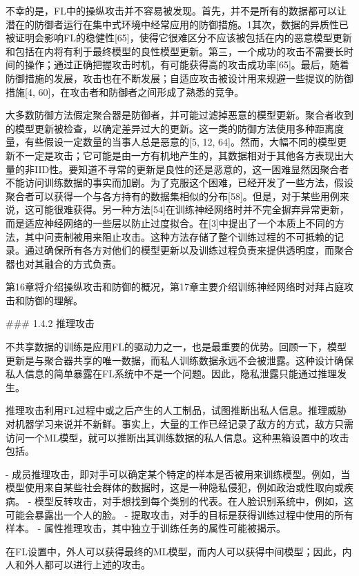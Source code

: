 不幸的是，FL中的操纵攻击并不容易被发现。首先，并不是所有的数据都可以让潜在的防御者运行在集中式环境中经常应用的防御措施。1其次，数据的异质性已被证明会影响FL的稳健性[65]，使得它很难区分不应该被包括在内的恶意模型更新和包括在内将有利于最终模型的良性模型更新。第三，一个成功的攻击不需要长时间的操作；通过正确把握攻击时机，有可能获得高的攻击成功率[65]。最后，随着防御措施的发展，攻击也在不断发展；自适应攻击被设计用来规避一些提议的防御措施[4, 60]，在攻击者和防御者之间形成了熟悉的竞争。

大多数防御方法假定聚合器是防御者，并可能过滤掉恶意的模型更新。聚合者收到的模型更新被检查，以确定差异过大的更新。这一类的防御方法使用多种距离度量，有些假设一定数量的当事人总是恶意的[5, 12, 64]。然而，大幅不同的模型更新不一定是攻击；它可能是由一方有机地产生的，其数据相对于其他各方表现出大量的非IID性。要知道不寻常的更新是良性的还是恶意的，这一困难显然因聚合者不能访问训练数据的事实而加剧。为了克服这个困难，已经开发了一些方法，假设聚合者可以获得一个与各方持有的数据集相似的分布[58]。但是，对于某些用例来说，这可能很难获得。另一种方法[54]在训练神经网络时并不完全摒弃异常更新，而是适应神经网络的一些层以防止过度拟合。在[3]中提出了一个本质上不同的方法，其中问责制被用来阻止攻击。这种方法存储了整个训练过程的不可抵赖的记录。通过确保所有各方对他们的模型更新以及训练过程负责来提供透明度，而聚合器也对其融合的方式负责。

第16章将介绍操纵攻击和防御的概况，第17章主要介绍训练神经网络时对拜占庭攻击和防御的理解。

### 1.4.2 推理攻击

不共享数据的训练是应用FL的驱动力之一，也是最重要的优势。回顾一下，模型更新是与聚合器共享的唯一数据，而私人训练数据永远不会被泄露。这种设计确保私人信息的简单暴露在FL系统中不是一个问题。因此，隐私泄露只能通过推理发生。

推理攻击利用FL过程中或之后产生的人工制品，试图推断出私人信息。推理威胁对机器学习来说并不新鲜。事实上，大量的工作已经记录了敌方的方式，敌方只需访问一个ML模型，就可以推断出其训练数据的私人信息。这种黑箱设置中的攻击包括。

- 成员推理攻击，即对手可以确定某个特定的样本是否被用来训练模型。例如，当模型使用来自某些社会群体的数据时，这是一种隐私侵犯，例如政治或性取向或疾病。
- 模型反转攻击，对手想找到每个类别的代表。在人脸识别系统中，例如，这可能会暴露出一个人的脸。
- 提取攻击，对手的目标是获得训练过程中使用的所有样本。
- 属性推理攻击，其中独立于训练任务的属性可能被揭示。

在FL设置中，外人可以获得最终的ML模型，而内人可以获得中间模型；因此，内人和外人都可以进行上述的攻击。

